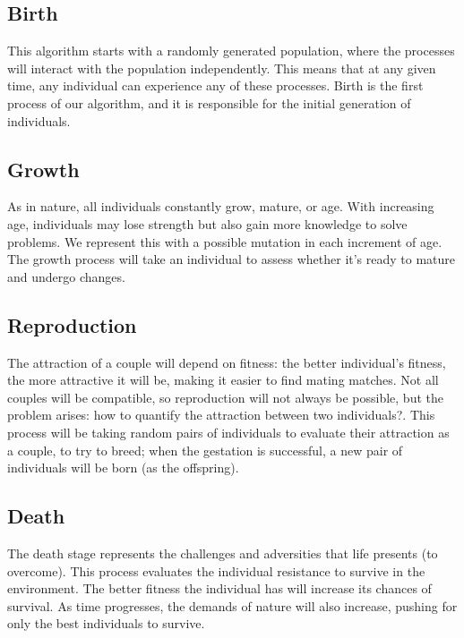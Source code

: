 \documentclass[runningheads]{llncs}
\begin{document}
\subsection{Birth}

This algorithm starts with a randomly generated population, where the processes
will interact with the population independently. This means that at any given
time, any individual can experience any of these processes. Birth is the first
process of our algorithm, and it is responsible for the initial generation of
individuals.

\subsection{Growth}

As in nature, all individuals constantly grow, mature, or age. With increasing
age, individuals may lose strength but also gain more knowledge to solve
problems. We represent this with a possible mutation in each increment of age.
The growth process will take an individual to assess whether it's ready to
mature and undergo changes.

\subsection{Reproduction}

The attraction of a couple will depend on fitness: the better individual's
fitness, the more attractive it will be, making it easier to find mating
matches. Not all couples will be compatible, so reproduction will not always be
possible, but the problem arises: how to quantify the attraction between two
individuals?. This process will be taking random pairs of individuals to
evaluate their attraction as a couple, to try to breed; when the gestation is
successful, a new pair of individuals will be born (as the offspring).

\subsection{Death}

The death stage represents the challenges and adversities that life presents
(to overcome). This process evaluates the individual resistance to survive in
the environment. The better fitness the individual has will increase its
chances of survival. As time progresses, the demands of nature will also
increase, pushing for only the best individuals to survive.
\end{document}
